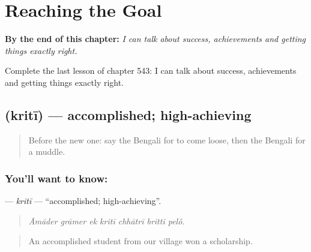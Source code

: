 
\chapter{Reaching the Goal}
\label{ch:bn-reaching-the-goal}

\begin{chapteropening}
\textbf{By the end of this chapter:} \emph{I can talk about success, achievements and getting things exactly right.}

Complete the last lesson of chapter 543: I can talk about success, achievements and getting things exactly right.
\end{chapteropening}

\section[\texorpdfstring{\bn{কৃতী} (kritī)}{কৃতী (kritī)}]{ (kritī) — accomplished; high-achieving}

\label{lesson:BN-C543-kriti}



\begin{quote}
Before the new one: say the Bengali for to come loose, then the Bengali for a muddle.
\end{quote}

\subsection*{You'll want to know: }
\textbf{} — \emph{kritī} — \textquotedblleft{}accomplished; high-achieving\textquotedblright{}.

\begin{quote}
      
\end{quote}

\begin{quote}
\emph{Āmāder grāmer ek kritī chhātrī britti pelô.}
\end{quote}

\begin{quote}
An accomplished student from our village won a scholarship.
\end{quote}

